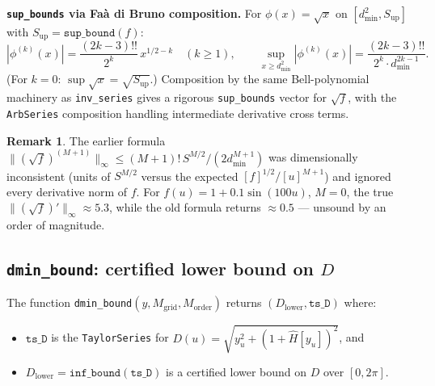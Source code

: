 \documentclass[11pt]{article}
\theoremstyle{definition}
\newtheorem{remark}{Remark}
\begin{document}
\textbf{\texttt{sup\_bounds} via Fa\`a di Bruno composition.}
For $\phi(x) = \sqrt{x}$ on $[d_{\min}^2, S_{\mathrm{up}}]$ with
$S_{\mathrm{up}} = \texttt{sup\_bound}(f)$:
\[
  |\phi^{(k)}(x)| = \frac{(2k{-}3)!!}{2^k}\, x^{1/2 - k}
  \quad (k \ge 1),
  \qquad
  \sup_{x \ge d_{\min}^2} |\phi^{(k)}(x)|
    = \frac{(2k{-}3)!!}{2^k \cdot d_{\min}^{2k-1}}.
\]
(For $k = 0$: $\sup \sqrt{x} = \sqrt{S_{\mathrm{up}}}$.)
Composition by the same Bell-polynomial machinery as \texttt{inv\_series}
gives a rigorous \texttt{sup\_bounds} vector for $\sqrt{f}$, with the
\texttt{ArbSeries} composition handling intermediate derivative cross terms.

\begin{remark}
The earlier formula
$\|(\sqrt{f})^{(M+1)}\|_\infty \le (M+1)!\,S^{M/2}/(2 d_{\min}^{M+1})$
was dimensionally inconsistent (units of $S^{M/2}$ versus the expected
$[f]^{1/2}/[u]^{M+1}$) and ignored every derivative norm of $f$. For
$f(u) = 1 + 0.1\sin(100u)$, $M = 0$, the true $\|(\sqrt{f})'\|_\infty \approx 5.3$,
while the old formula returns $\approx 0.5$ — unsound by an order of magnitude.
\end{remark}

\subsection{\texttt{dmin\_bound}: certified lower bound on \texorpdfstring{$D$}{D}}

The function \texttt{dmin\_bound}$(y, M_{\mathrm{grid}}, M_{\mathrm{order}})$
returns $(D_{\mathrm{lower}}, \texttt{ts\_D})$ where:
\begin{itemize}
  \item $\texttt{ts\_D}$ is the \texttt{TaylorSeries} for
        $D(u) = \sqrt{y_u^2 + (1 + \hat H[y_u])^2}$, and
  \item $D_{\mathrm{lower}} = \texttt{inf\_bound}(\texttt{ts\_D})$ is a
        certified lower bound on $D$ over $[0,2\pi]$.
\end{itemize}
\end{document}
